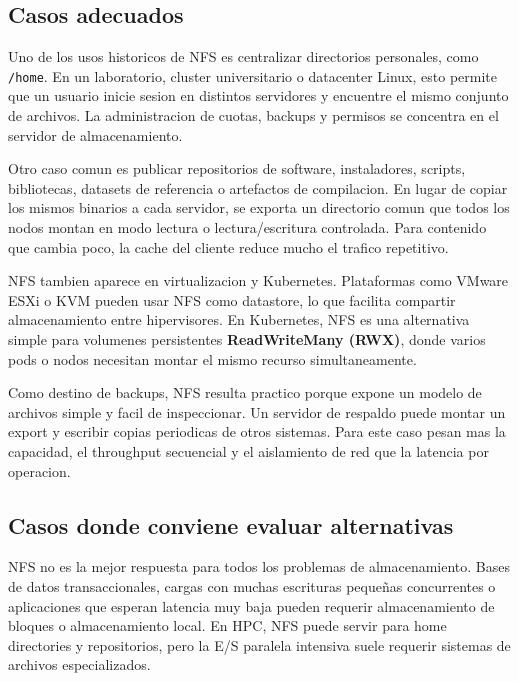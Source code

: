 \subsection{Casos adecuados}

Uno de los usos historicos de NFS es centralizar directorios personales, como \texttt{/home}. En un laboratorio, cluster universitario o datacenter Linux, esto permite que un usuario inicie sesion en distintos servidores y encuentre el mismo conjunto de archivos. La administracion de cuotas, backups y permisos se concentra en el servidor de almacenamiento.

Otro caso comun es publicar repositorios de software, instaladores, scripts, bibliotecas, datasets de referencia o artefactos de compilacion. En lugar de copiar los mismos binarios a cada servidor, se exporta un directorio comun que todos los nodos montan en modo lectura o lectura/escritura controlada. Para contenido que cambia poco, la cache del cliente reduce mucho el trafico repetitivo.

NFS tambien aparece en virtualizacion y Kubernetes. Plataformas como VMware ESXi o KVM pueden usar NFS como datastore, lo que facilita compartir almacenamiento entre hipervisores. En Kubernetes, NFS es una alternativa simple para volumenes persistentes \textbf{ReadWriteMany (RWX)}, donde varios pods o nodos necesitan montar el mismo recurso simultaneamente.

Como destino de backups, NFS resulta practico porque expone un modelo de archivos simple y facil de inspeccionar. Un servidor de respaldo puede montar un export y escribir copias periodicas de otros sistemas. Para este caso pesan mas la capacidad, el throughput secuencial y el aislamiento de red que la latencia por operacion.

\subsection{Casos donde conviene evaluar alternativas}

NFS no es la mejor respuesta para todos los problemas de almacenamiento. Bases de datos transaccionales, cargas con muchas escrituras pequeñas concurrentes o aplicaciones que esperan latencia muy baja pueden requerir almacenamiento de bloques o almacenamiento local. En HPC, NFS puede servir para home directories y repositorios, pero la E/S paralela intensiva suele requerir sistemas de archivos especializados.
